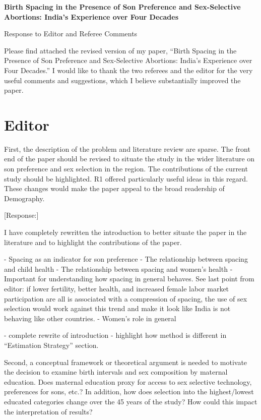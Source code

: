 \documentclass[letterpaper,12pt]{article}
\title{} \author{}
\begin{document}
\begin{center} \textbf{\large Birth Spacing in the Presence of Son
Preference and 
Sex-Selective Abortions: India's Experience over Four Decades}
\end{center}

\begin{center} Response to Editor and Referee Comments \end{center}

\noindent Please find attached the revised version of my paper,
``Birth Spacing in the Presence of Son Preference and Sex-Selective
Abortions:
India's Experience over Four Decades.''
I would like to thank the two referees and the editor for the very useful comments and 
suggestions, which I believe substantially improved the paper.

\section*{Editor}

First, the description of the problem and literature review are sparse.
The front end of the paper should be revised to situate the study in the
wider literature on son preference and sex selection in the region. The
contributions of the current study should be highlighted. R1 offered
particularly useful ideas in this regard. These changes would make the
paper appeal to the broad readership of Demography.

[Response:]

I have completely rewritten the introduction to better situate the paper in the literature
and to highlight the contributions of the paper.

- Spacing as an indicator for son preference
- The relationship between spacing and child health
- The relationship between spacing and women's health
- Important for understanding how spacing in general behaves. See last point from
editor: if lower fertility, better health, and increased female labor market participation 
are all is associated with a compression of spacing, the use of sex selection would
work against this trend and make it look like India is not behaving like other countries.
- Women's role in general

- complete rewrite of introduction
- highlight how method is different in ``Estimation Strategy'' section.



Second, a conceptual framework or theoretical argument is needed to
motivate the decision to examine birth intervals and sex composition by
maternal education. Does maternal education proxy for access to sex
selective technology, preferences for sons, etc.? In addition, how does
selection into the highest/lowest educated categories change over the 45
years of the study? How could this impact the interpretation of results?
\end{document}
